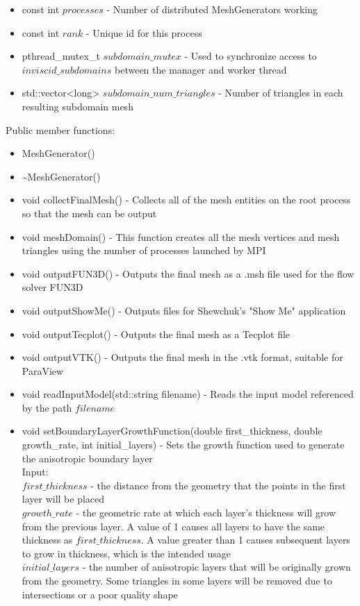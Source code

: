 \documentclass[manuscript, screen]{acmart}
\begin{document}
\begin{itemize}
\item const int $processes$ - Number of distributed MeshGenerators working

\item const int $rank$ - Unique id for this process

\item pthread\_mutex\_t $subdomain\_mutex$ - Used to synchronize access to $inviscid\_subdomains$ between the manager and worker thread

\item std::vector<long> $subdomain\_num\_triangles$ - Number of triangles in each resulting subdomain mesh
\end{itemize}

Public member functions:
\begin{itemize}
\item MeshGenerator()

\item \textasciitilde{}MeshGenerator()
%

\item void collectFinalMesh() - Collects all of the mesh entities on the root process so that the mesh can be output

\item void meshDomain() - This function creates all the mesh vertices and mesh triangles using the number of processes launched by MPI

\item void outputFUN3D() - Outputs the final mesh as a .msh file used for the flow solver FUN3D
\item void outputShowMe() - Outputs files for Shewchuk's "Show Me" application
\item void outputTecplot() - Outputs the final mesh as a Tecplot file
\item void outputVTK() - Outputs the final mesh in the .vtk format, suitable for ParaView

\item void readInputModel(std::string filename) - Reads the input model referenced by the path $filename$

\item void setBoundaryLayerGrowthFunction(double first\_thickness, double growth\_rate, int initial\_layers) - Sets the growth function used to generate the anisotropic boundary layer\\
Input:\\
$first\_thickness$ - the distance from the geometry that the points in the first layer will be placed\\
$growth\_rate$ - the geometric rate at which each layer's thickness will grow from the previous layer. A value of 1 causes all layers to have the same thickness as $first\_thickness$. A value greater than 1 causes subsequent layers to grow in thickness, which is the intended usage\\ 
$initial\_layers$ - the number of anisotropic layers that will be originally grown from the geometry. Some triangles in some layers will be removed due to intersections or a poor quality shape


\end{itemize}
\end{document}

